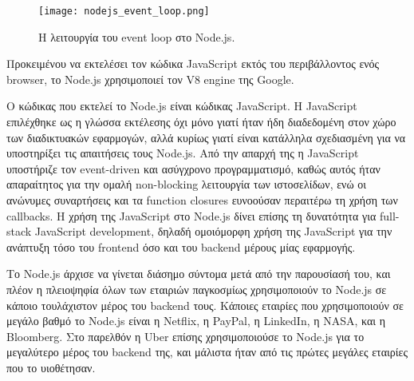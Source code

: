 \documentclass[../thesis.tex]{subfiles}
\begin{document}
\begin{figure}[!ht]
    \texttt{[image: nodejs\_event\_loop.png]}
    \centering
    \caption{Η λειτουργία του event loop στο Node.js\cite{node_eventloop_diagram}.}
\end{figure}


Προκειμένου να εκτελέσει τον κώδικα JavaScript εκτός του περιβάλλοντος ενός browser, το Node.js χρησιμοποιεί τον V8 engine της Google.

Ο κώδικας που εκτελεί το Node.js είναι κώδικας JavaScript.
Η JavaScript επιλέχθηκε ως η γλώσσα εκτέλεσης όχι μόνο γιατί ήταν ήδη διαδεδομένη στον χώρο των διαδικτυακών εφαρμογών, αλλά κυρίως γιατί είναι κατάλληλα σχεδιασμένη για να υποστηρίξει τις απαιτήσεις τους Node.js.
Από την απαρχή της η JavaScript υποστήριζε τον event-driven και ασύγχρονο προγραμματισμό, καθώς αυτός ήταν απαραίτητος για την ομαλή non-blocking λειτουργία των ιστοσελίδων, ενώ οι ανώνυμες συναρτήσεις και τα function closures ευνοούσαν περαιτέρω τη χρήση των callbacks.
Η χρήση της JavaScript στο Node.js δίνει επίσης τη δυνατότητα για full-stack JavaScript development, δηλαδή ομοιόμορφη χρήση της JavaScript για την ανάπτυξη τόσο του frontend όσο και του backend μέρους μίας εφαρμογής.

Το Node.js άρχισε να γίνεται διάσημο σύντομα μετά από την παρουσίασή του, και πλέον η πλειοψηφία όλων των εταιριών παγκοσμίως χρησιμοποιούν το Node.js σε κάποιο τουλάχιστον μέρος του backend τους.
Κάποιες εταιρίες που χρησιμοποιούν σε μεγάλο βαθμό το Node.js είναι η Netflix\cite{netflix}, η PayPal\cite{paypal}, η LinkedIn\cite{linkedIn}, η NASA\cite{nasa}, και η Bloomberg\cite{bloomberg}.
Στο παρελθόν η Uber επίσης χρησιμοποιούσε το Node.js για το μεγαλύτερο μέρος του backend της, και μάλιστα ήταν από τις πρώτες μεγάλες εταιρίες που το υιοθέτησαν\cite{uberNode}.
\end{document}
